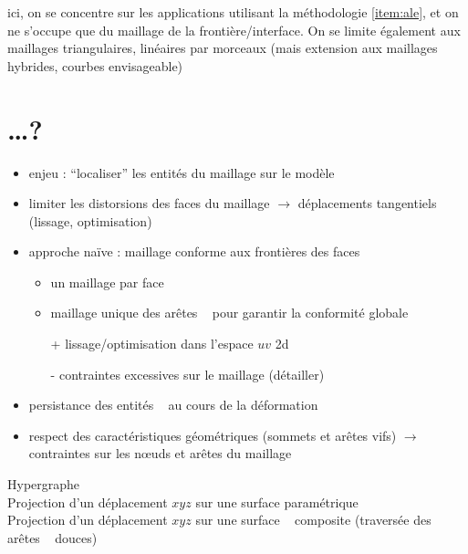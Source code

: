 ici, on se concentre sur les applications utilisant la méthodologie \ref{item:ale}, et on ne s'occupe que du maillage de la frontière/interface. On se limite également aux maillages triangulaires, linéaires par morceaux (mais extension aux maillages hybrides, courbes envisageable)

\section{\ldots?}%
\begin{itemize}
	\item enjeu : ``localiser'' les entités du maillage sur le modèle \brep
	\item limiter les distorsions des faces du maillage $\to$ déplacements tangentiels (lissage, optimisation)
	\item approche naïve : maillage conforme aux frontières des faces \brep
	\begin{itemize}
		\item un maillage par face \brep
		\item maillage unique des arêtes \brep~ pour garantir la conformité globale
		\item[+] lissage/optimisation dans l'espace $uv$ 2d
		\item[-] contraintes excessives sur le maillage (détailler)
	\end{itemize}
	\item persistance des entités \brep~ au cours de la déformation
	\item respect des caractéristiques géométriques (sommets et arêtes vifs) $\to$ contraintes sur les n\oe uds et arêtes du maillage
\end{itemize}


\bigskip

Hypergraphe\\
Projection d'un déplacement $xyz$ sur une surface paramétrique\\
Projection d'un déplacement $xyz$ sur une surface \brep~ composite (traversée des arêtes \brep~ douces)



